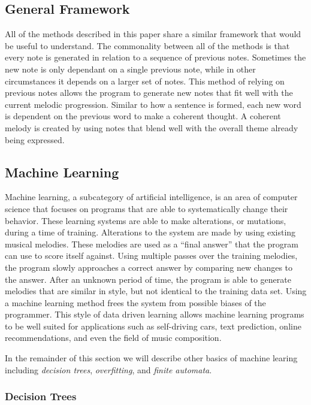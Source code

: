 \documentclass{sig-alternate}
\begin{document}
\subsection{General Framework}
\label{sec:framework}
	All of the methods described in this paper share a similar framework that would be useful to understand. The commonality between all of the methods is that every note is generated in relation to a sequence of previous notes. Sometimes the new note is only dependant on a single previous note, while in other circumstances it depends on a larger set of notes. This method of relying on previous notes allows the program to generate new notes that fit well with the current melodic progression. Similar to how a sentence is formed, each new word is dependent on the previous word to make a coherent thought. A coherent melody is created by using notes that blend well with the overall theme already being expressed. 

\subsection{Machine Learning}
\label{sec:machinelearning}
	Machine learning, a subcategory of artificial intelligence, is an area of computer science that focuses on programs that are able to systematically change their behavior. These learning systems are able to make alterations, or mutations, during a time of training. Alterations to the system are made by using existing musical melodies. These melodies are used as a ``final answer'' that the program can use to score itself against.  Using multiple passes over the training melodies, the program slowly approaches a correct answer by comparing new changes to the answer. After an unknown period of time, the program is able to generate melodies that are similar in style, but not identical to the training data set. Using a machine learning method frees the system from possible biases of the programmer. This style of data driven learning allows machine learning programs to be well suited for applications such as self-driving cars, text prediction, online recommendations, and even the field of music composition.
	
	In the remainder of this section we will describe other basics of machine learing including \textit{decision trees}, \textit{overfitting}, and \textit{finite automata}.

\subsubsection{Decision Trees}
\label{sec:decision_trees}
\end{document}
